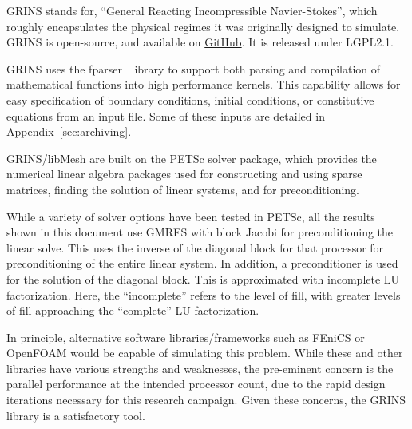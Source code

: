 
GRINS stands for, ``General Reacting Incompressible Navier-Stokes'',
which roughly encapsulates the physical regimes it was originally
designed to simulate. GRINS is open-source, and available on
\hyperref[www.github.com/grinsfem/grins]{GitHub}. It is released 
under LGPL2.1.  


GRINS uses the fparser~\cite{fparser}
library to support both parsing and compilation of mathematical
functions into high performance kernels. This capability allows for
easy specification of boundary conditions, initial conditions, or
constitutive equations from an input file. Some of these inputs are
detailed in Appendix~\ref{sec:archiving}. 

GRINS/libMesh are built on the PETSc\cite{petsc} solver package, which
provides the numerical linear algebra packages used for constructing and
using sparse matrices, finding the solution of linear systems,
and for preconditioning.  

While a variety of solver options have been tested in PETSc, all the
results shown in this document use GMRES with block Jacobi for
preconditioning\cite{Saad:2003} the linear solve. This uses the
inverse of the diagonal block for that processor for preconditioning of
the entire linear system. In addition, a preconditioner is used for the
solution of the diagonal block. This is approximated with incomplete LU
factorization\cite{chan1997approximate}. Here, the ``incomplete'' refers 
to the level of fill, with greater levels of fill approaching
the ``complete'' LU factorization. 

In principle, alternative software libraries/frameworks such as
FEniCS\cite{AlnaesBlechta2015a} or OpenFOAM\cite{jasak2007openfoam}
would be capable of simulating this problem. While these and
other libraries have various strengths and weaknesses, the pre-eminent
concern is the parallel performance at the intended processor count, due
to the rapid design iterations necessary for this research
campaign. Given these concerns, the GRINS library is a satisfactory tool. 

